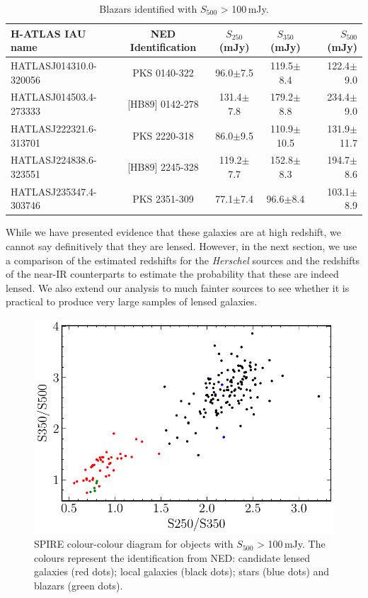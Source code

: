 \documentclass[fleqn,usenatbib]{mnras}
\begin{document}
\begin{table}
	\centering
	\caption{Blazars identified with $S_{500}$ > 100\,mJy.}
	\label{tab:blazars}
	\begin{tabular}{lcccr}
		\hline
		\hline
		H-ATLAS IAU name & NED Identification & $S_{250}$ (mJy) & $S_{350}$ (mJy) & $S_{500}$ (mJy)\\ 
		\hline
		HATLASJ014310.0-320056 & PKS 0140-322 & 96.0$\pm$7.5 & 119.5$\pm$8.4 & 122.4$\pm$9.0 \\
		HATLASJ014503.4-273333 & [HB89] 0142-278 & 131.4$\pm$7.8 & 179.2$\pm$8.8 & 234.4$\pm$9.0 \\
		HATLASJ222321.6-313701 & PKS 2220-318 & 86.0$\pm$9.5 & 110.9$\pm$10.5 & 131.9$\pm$11.7 \\
		HATLASJ224838.6-323551 & [HB89] 2245-328 & 119.2$\pm$7.7 & 152.8$\pm$8.3 & 194.7$\pm$8.6 \\
		HATLASJ235347.4-303746 & PKS 2351-309 & 77.1$\pm$7.4 & 96.6$\pm$8.4 & 103.1$\pm$8.9 \\
		\hline
		\hline
	\end{tabular}
\end{table}

While we have presented evidence that these galaxies are at high redshift, we cannot say definitively that they are lensed. However, in the next section, we use a comparison of the estimated redshifts for the \textit{Herschel} sources and the redshifts of the near-IR counterparts to estimate the probability that these are indeed lensed. We also extend our analysis to much fainter sources to see whether it is practical to produce very large samples of lensed galaxies.

\begin{figure}
	\includegraphics[width=\columnwidth]{Fig_9}
	\caption{SPIRE colour-colour diagram for objects with $S_{500}$ > 100\,mJy. The colours represent the identification from NED: candidate lensed galaxies (red dots); local galaxies (black dots); stars (blue dots) and blazars (green dots).} 
	\label{fig:colour_100mjy}
\end{figure}
\end{document}
